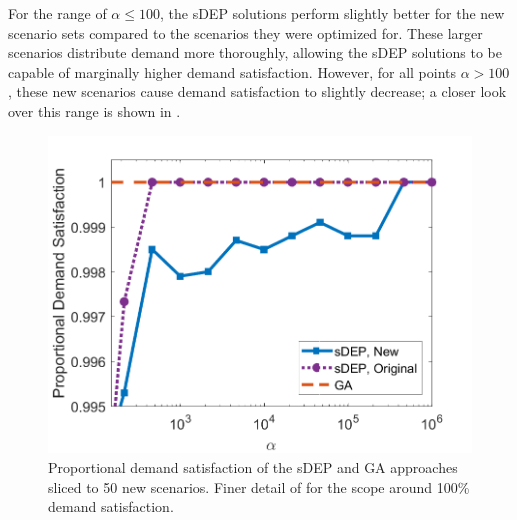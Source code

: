 \documentclass[12pt,dvipsnames]{report}
\begin{document}
For the range of $\alpha \leq 100$, the sDEP solutions perform slightly better for the new scenario sets compared to the scenarios they were optimized for.  These larger scenarios distribute demand more thoroughly, allowing the sDEP solutions to be capable of marginally higher demand satisfaction.  However, for all points $\alpha > 100$, these new scenarios cause demand satisfaction to slightly decrease; a closer look over this range is shown in .

\begin{figure}[tp]
	\centering
	\includegraphics[height=0.4\textheight]{Figures/Prelim_EvalO25_ComparisonSatisfactionZoomed}
	\caption[Demand satisfaction of the preliminary simulations evaluated against 50 new scenarios in finer detail]{Proportional demand satisfaction of the sDEP and GA approaches sliced to 50 new scenarios. Finer detail of  for the scope around 100\% demand satisfaction.}
	\label{fig:Prelim_VWNCompSatisEvalClose}
\end{figure}
\end{document}

